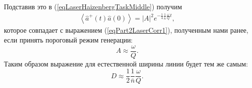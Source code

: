 Подставив это в (\ref{eqLaserHaizenbergTaskMiddle}) получим
\begin{eqnarray}
\left<\hat{a}^{+}\left(t\right)\hat{a}\left(0\right)\right> =
\left|A\right|^2 e^{-\frac{1}{4}\frac{1}{\bar{n}}\frac{\omega}{Q} t},
\label{eqLaserHaizenbergTaskMiddleFinal}
\end{eqnarray}
которое совпадает с выражением (\ref{eqPart2LaserCorr1}), полученным
нами ранее, если принять пороговый режим генерации: 
\[
A \approx \frac{\omega}{Q}.
\]
Таким образом выражение для естественной ширины линии будет тем же
самым:
\[
D \approx \frac{1}{2}\frac{1}{\bar{n}}\frac{\omega}{Q}.
\]

